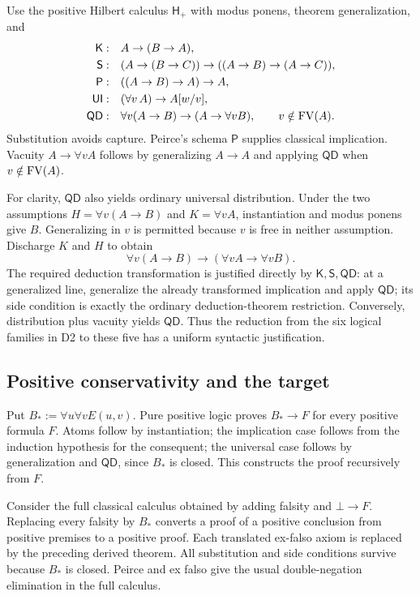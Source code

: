 Use the positive Hilbert calculus $\mathsf H_+$ with modus ponens, theorem generalization, and
\begin{align*}
 \mathsf K:\quad&A\to(B\to A),\\
 \mathsf S:\quad&(A\to(B\to C))\to((A\to B)\to(A\to C)),\\
 \mathsf P:\quad&((A\to B)\to A)\to A,\\
 \mathsf{UI}:\quad&(\forall v\,A)\to A[w/v],\\
 \mathsf{QD}:\quad&\forall v(A\to B)\to(A\to\forall vB),
                 \qquad v\notin\operatorname{FV}(A).
\end{align*}
Substitution avoids capture. Peirce's schema $\mathsf P$ supplies classical implication. Vacuity $A\to\forall vA$ follows by generalizing $A\to A$ and applying $\mathsf{QD}$ when $v\notin\operatorname{FV}(A)$.

For clarity, $\mathsf{QD}$ also yields ordinary universal distribution. Under the two assumptions $H=\forall v(A\to B)$ and $K=\forall vA$, instantiation and modus ponens give $B$. Generalizing in $v$ is permitted because $v$ is free in neither assumption. Discharge $K$ and $H$ to obtain
\[
 \forall v(A\to B)\to(\forall vA\to\forall vB).
\]
The required deduction transformation is justified directly by $\mathsf K,\mathsf S,\mathsf{QD}$: at a generalized line, generalize the already transformed implication and apply $\mathsf{QD}$; its side condition is exactly the ordinary deduction-theorem restriction. Conversely, distribution plus vacuity yields $\mathsf{QD}$. Thus the reduction from the six logical families in D2 to these five has a uniform syntactic justification.

\subsection{Positive conservativity and the target}

Put $B_*:=\forall u\forall v E(u,v)$. Pure positive logic proves $B_*\to F$ for every positive formula $F$. Atoms follow by instantiation; the implication case follows from the induction hypothesis for the consequent; the universal case follows by generalization and $\mathsf{QD}$, since $B_*$ is closed. This constructs the proof recursively from $F$.

Consider the full classical calculus obtained by adding falsity and $\bot\to F$. Replacing every falsity by $B_*$ converts a proof of a positive conclusion from positive premises to a positive proof. Each translated ex-falso axiom is replaced by the preceding derived theorem. All substitution and side conditions survive because $B_*$ is closed. Peirce and ex falso give the usual double-negation elimination in the full calculus.

